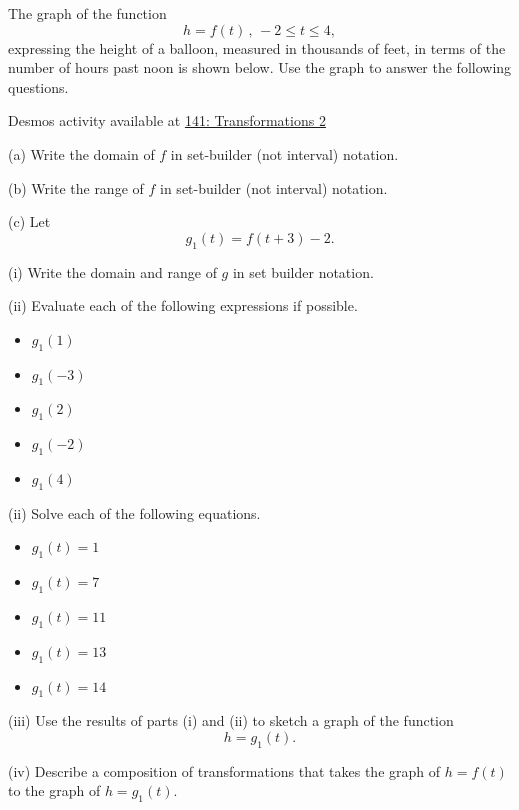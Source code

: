 \documentclass{ximera}
\begin{document}
\begin{question}  \label{Q:3d3rfff}
The graph of the function
\[
   h = f(t) \,  ,  \, -2 \leq t \leq 4,
\]
expressing the height of a balloon, measured in thousands of feet, in terms of the number of hours past noon is shown below. Use the graph to answer the following questions.


\begin{onlineOnly}
    \begin{center}
\end{center}
\end{onlineOnly}

Desmos activity available at \href{https://www.desmos.com/calculator/xupooue7ew}{141: Transformations 2}


(a) Write the domain of $f$ in set-builder (not interval) notation.

(b) Write the range of $f$ in set-builder (not interval) notation.

(c) Let 
\[
    g_1(t) = f(t+3) - 2 .
\]
 
(i) Write the domain and range of $g$ in set builder notation.

(ii) Evaluate each of the following expressions if possible.

\begin{itemize}
\item{$g_1(1)$}

\item{$g_1(-3)$}

\item{$g_1(2)$}

\item{$g_1(-2)$}

\item{$g_1(4)$}
\end{itemize}

(ii) Solve each of the following equations.

\begin{itemize}
\item{$g_1(t) = 1$}

\item{$g_1(t) = 7$}

\item{$g_1(t) = 11$}

\item{$g_1(t) = 13$}

\item{$g_1(t) = 14$}
\end{itemize}

(iii) Use the results of parts (i) and (ii) to sketch a graph of the function 
\[
      h = g_1(t).
\]

(iv) Describe a composition of transformations that takes the graph of $h=f(t)$ to the graph of $h=g_1(t)$.

\end{question}
\end{document}
